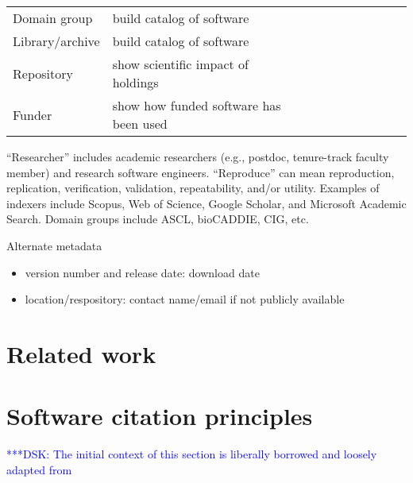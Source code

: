 \documentclass[11pt, oneside]{amsart}
\newcommand{\katznote}[1]{ {\textcolor{blue} { ***DSK: #1 }}}
\begin{document}
\begin{table}[htbp]
\begin{tabular}{@{}l l c c c c c c c c@{}}
Domain group & build catalog of software 			& \textbullet & \textbullet & \textbullet & \textbullet & \textbullet & \textbullet &  & \\
Library\slash archive & build catalog of software 	& \textbullet & \textbullet & \textbullet & \textbullet & \textbullet & \textbullet &  & \\
Repository & show scientific impact of holdings 	& \textbullet &   &   &   &   & \textbullet & \textbullet & \\
Funder & show how funded software has been used		& \textbullet &   &   &   &   & \textbullet & \textbullet & \\
\bottomrule
\end{tabular}
\label{tab:use_cases}
\end{table}%

``Researcher'' includes academic researchers (e.g., postdoc, tenure-track faculty member) and research software engineers.
``Reproduce'' can mean reproduction, replication, verification, validation, repeatability, and\slash or utility.
Examples of indexers include Scopus, Web of Science, Google Scholar, and Microsoft Academic Search.
Domain groups include ASCL, bioCADDIE, CIG, etc.

Alternate metadata
\begin{itemize}
\item version number and release date: download date
\item location\slash respository: contact name\slash email if not publicly available
\end{itemize}




\section{Related work}
\label{sec:related_work}



\section{Software citation principles}
\label{sec:principles}

\katznote{The initial context of this section is liberally borrowed and loosely adapted from \cite{data-citation-principles}}
\end{document}
